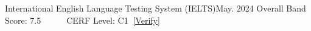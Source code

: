 
\resumeSubheading
    {International English Language Testing System (IELTS)}{May. 2024}
    {Overall Band Score: 7.5$\qquad\quad$CERF Level: C1$\;\;$\href{https://drive.google.com/file/d/1DUf0rEvjMC4fDwx3n4EAjNYK_BOYwWLA/view?usp=drive_link}{[\underline{Verify}]}}{}
    \resumeItemListStart
    \resumeItemListEnd